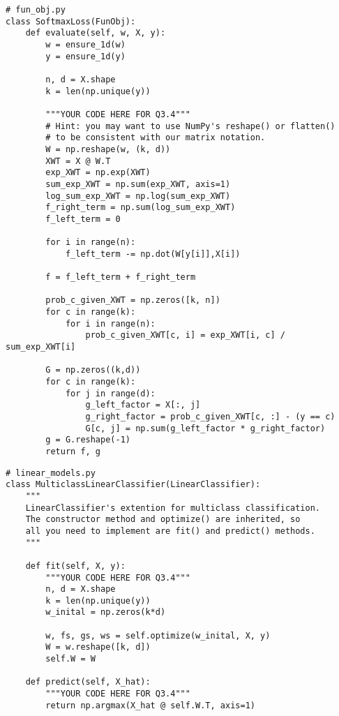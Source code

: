 \documentclass{article}
\begin{document}
\begin{verbatim}
# fun_obj.py
class SoftmaxLoss(FunObj):
    def evaluate(self, w, X, y):
        w = ensure_1d(w)
        y = ensure_1d(y)

        n, d = X.shape
        k = len(np.unique(y))

        """YOUR CODE HERE FOR Q3.4"""
        # Hint: you may want to use NumPy's reshape() or flatten()
        # to be consistent with our matrix notation.
        W = np.reshape(w, (k, d))
        XWT = X @ W.T
        exp_XWT = np.exp(XWT)
        sum_exp_XWT = np.sum(exp_XWT, axis=1)
        log_sum_exp_XWT = np.log(sum_exp_XWT)
        f_right_term = np.sum(log_sum_exp_XWT)
        f_left_term = 0
        
        for i in range(n):
            f_left_term -= np.dot(W[y[i]],X[i])
        
        f = f_left_term + f_right_term

        prob_c_given_XWT = np.zeros([k, n])
        for c in range(k):
            for i in range(n):
                prob_c_given_XWT[c, i] = exp_XWT[i, c] / sum_exp_XWT[i]
        
        G = np.zeros((k,d))
        for c in range(k):
            for j in range(d):
                g_left_factor = X[:, j]
                g_right_factor = prob_c_given_XWT[c, :] - (y == c)
                G[c, j] = np.sum(g_left_factor * g_right_factor)
        g = G.reshape(-1)
        return f, g
\end{verbatim}
\newpage
\begin{verbatim}
# linear_models.py
class MulticlassLinearClassifier(LinearClassifier):
    """
    LinearClassifier's extention for multiclass classification.
    The constructor method and optimize() are inherited, so
    all you need to implement are fit() and predict() methods.
    """

    def fit(self, X, y):
        """YOUR CODE HERE FOR Q3.4"""
        n, d = X.shape
        k = len(np.unique(y))
        w_inital = np.zeros(k*d)

        w, fs, gs, ws = self.optimize(w_inital, X, y)
        W = w.reshape([k, d])
        self.W = W

    def predict(self, X_hat):
        """YOUR CODE HERE FOR Q3.4"""
        return np.argmax(X_hat @ self.W.T, axis=1)
\end{verbatim}
\newpage
\end{document}
